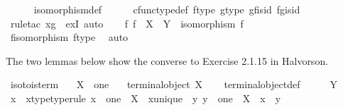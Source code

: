 \begin{isabellebody}
\ \ \ \ \isamarkupfalse%
\ isomorphism{\isacharunderscore}{\kern0pt}def\isanewline
\ \ \ \ \isamarkupfalse%
\ cfunc{\isacharunderscore}{\kern0pt}type{\isacharunderscore}{\kern0pt}def\ f{\isacharunderscore}{\kern0pt}type\ g{\isacharunderscore}{\kern0pt}type\ g{\isacharunderscore}{\kern0pt}f{\isacharunderscore}{\kern0pt}is{\isacharunderscore}{\kern0pt}id\ f{\isacharunderscore}{\kern0pt}g{\isacharunderscore}{\kern0pt}is{\isacharunderscore}{\kern0pt}id\isanewline
\ \ \ \ \isamarkupfalse%
\ {\isacharparenleft}{\kern0pt}rule{\isacharunderscore}{\kern0pt}tac\ x{\isacharequal}{\kern0pt}g\ \ exI{\isacharcomma}{\kern0pt}\ auto{\isacharparenright}{\kern0pt}\isanewline
\isanewline
\ \ \isamarkupfalse%
\ {\isachardoublequoteopen}{\isasymexists}f{\isachardot}{\kern0pt}\ f\ {\isacharcolon}{\kern0pt}\ X\ {\isasymrightarrow}\ Y\ {\isasymand}\ isomorphism\ f{\isachardoublequoteclose}\isanewline
\ \ \ \ \isamarkupfalse%
\ f{\isacharunderscore}{\kern0pt}isomorphism\ f{\isacharunderscore}{\kern0pt}type\ \isamarkupfalse%
\ auto\isanewline
{}\isamarkupfalse%
%
\endisatagproof
{\isafoldproof}%
%
\isadelimproof
%
\endisadelimproof
%
\begin{isamarkuptext}%
The two lemmas below show the converse to Exercise 2.1.15 in Halvorson.%
\end{isamarkuptext}\isamarkuptrue%
\isamarkupfalse%
\ iso{\isacharunderscore}{\kern0pt}to{}{\isacharunderscore}{\kern0pt}is{\isacharunderscore}{\kern0pt}term{\isacharcolon}{\kern0pt}\isanewline
\ \ \ {\isachardoublequoteopen}X\ {\isasymcong}\ one{\isachardoublequoteclose}\isanewline
\ \ \ {\isachardoublequoteopen}terminal{\isacharunderscore}{\kern0pt}object\ X{\isachardoublequoteclose}\isanewline
%
\isadelimproof
\ \ %
\endisadelimproof
%
\isatagproof
{}\isamarkupfalse%
\ terminal{\isacharunderscore}{\kern0pt}object{\isacharunderscore}{\kern0pt}def\isanewline
{}\isamarkupfalse%
\ \isanewline
\ \ \isamarkupfalse%
\ Y\isanewline
\ \ \isamarkupfalse%
\ x\ \ x{\isacharunderscore}{\kern0pt}type{\isacharbrackleft}{\kern0pt}type{\isacharunderscore}{\kern0pt}rule{\isacharbrackright}{\kern0pt}{\isacharcolon}{\kern0pt}\ {\isachardoublequoteopen}x\ {\isacharcolon}{\kern0pt}\ one\ {\isasymrightarrow}\ X{\isachardoublequoteclose}\ \ x{\isacharunderscore}{\kern0pt}unique{\isacharcolon}{\kern0pt}\ {\isachardoublequoteopen}{\isasymforall}\ y{\isachardot}{\kern0pt}\ y\ {\isacharcolon}{\kern0pt}\ one\ {\isasymrightarrow}\ X\ {\isasymlongrightarrow}\ x\ {\isacharequal}{\kern0pt}\ y{\isachardoublequoteclose}\isanewline

\end{isabellebody}
